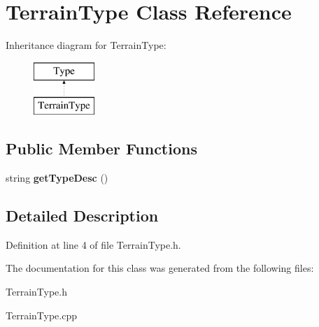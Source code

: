 \hypertarget{classTerrainType}{}\section{Terrain\+Type Class Reference}
\label{classTerrainType}
Inheritance diagram for Terrain\+Type\+:\begin{figure}[H]
\begin{center}
\leavevmode
\includegraphics[height=2.000000cm]{classTerrainType}
\end{center}
\end{figure}
\subsection*{Public Member Functions}
\begin{DoxyCompactItemize}
\item 
\mbox{\label{classTerrainType_af24f4291676b6862c90b0d29598fcb11}} 
string {\bfseries get\+Type\+Desc} ()
\end{DoxyCompactItemize}


\subsection{Detailed Description}


Definition at line 4 of file Terrain\+Type.\+h.



The documentation for this class was generated from the following files\+:\begin{DoxyCompactItemize}
\item 
Terrain\+Type.\+h\item 
Terrain\+Type.\+cpp\end{DoxyCompactItemize}
